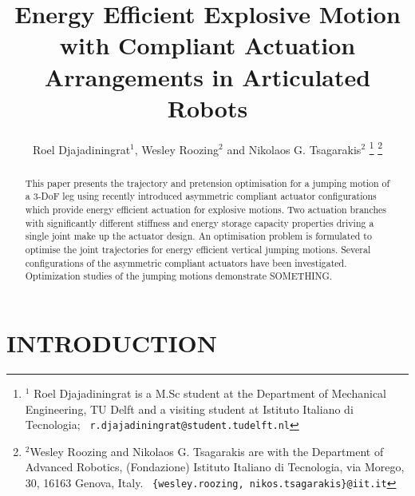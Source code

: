 \documentclass[letterpaper, 10 pt, conference]{ieeeconf}  %
\title{\LARGE \bf
Energy Efficient Explosive Motion with Compliant Actuation Arrangements in Articulated Robots
}
\author{Roel Djajadiningrat$^{1}$, Wesley Roozing$^{2}$ and Nikolaos G. Tsagarakis$^{2}$%
\thanks{$^{1}$ Roel Djajadiningrat is a M.Sc student at the Department of Mechanical Engineering, TU Delft and a visiting student at Istituto Italiano di Tecnologia;
        {\tt\ r.djajadiningrat@student.tudelft.nl}
  }%
\thanks{$^{2}$Wesley Roozing and Nikolaos G. Tsagarakis are with the Department of Advanced Robotics,
	(Fondazione) Istituto Italiano di Tecnologia, via Morego,
	30, 16163 Genova, Italy.
        {\tt\ \{wesley.roozing, nikos.tsagarakis\}@iit.it}
     }%
}
\begin{document}
\maketitle
\thispagestyle{empty}
\pagestyle{empty}


\begin{abstract}

This paper presents the trajectory and pretension optimisation for a jumping motion of a 3-DoF leg using recently introduced asymmetric compliant actuator configurations which provide energy efficient actuation for explosive motions. Two actuation branches
with significantly different stiffness and energy storage capacity properties driving a single joint make up the actuator design. An optimisation problem is formulated to optimise the joint trajectories for energy efficient vertical jumping motions. Several configurations of the asymmetric compliant actuators have been investigated. Optimization studies of the jumping motions demonstrate SOMETHING. 

\end{abstract}


\section{INTRODUCTION}
\end{document}
